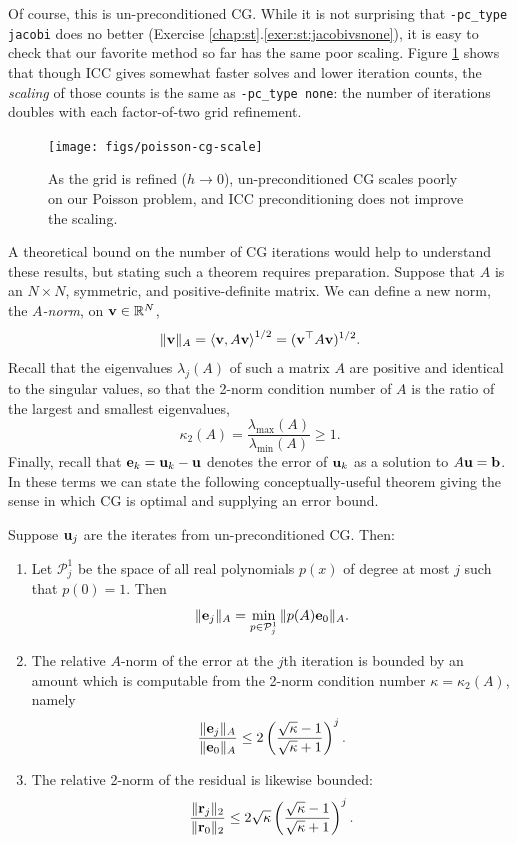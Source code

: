 Of course, this is un-preconditioned CG.  While it is not surprising that \texttt{-pc\_type jacobi} does no better (Exercise \ref{chap:st}.\ref{exer:st:jacobivsnone}), it is easy to check that our favorite method so far has the same poor scaling.  Figure \ref{fig:poisson-cg-scale} shows that though ICC gives somewhat faster solves and lower iteration counts, the \emph{scaling} of those counts is the same as \texttt{-pc\_type none}: the number of iterations doubles with each factor-of-two grid refinement.

\begin{figure}
\bigskip
\texttt{[image: figs/poisson-cg-scale]}
\caption{As the grid is refined ($h\to 0$), un-preconditioned CG scales poorly on our Poisson problem, and ICC preconditioning does not improve the scaling.}
\label{fig:poisson-cg-scale}
\end{figure}

A theoretical bound on the number of CG iterations would help to understand these results, but stating such a theorem requires preparation.  Suppose that $A$ is an $N\times N$, symmetric, and positive-definite matrix.  We can define a new norm, the \emph{$A$-norm}, on $\mathbf{v}\in\mathbb{R}^N$,
\begin{equation}
\|\mathbf{v}\|_A = \left<\mathbf{v},A\mathbf{v}\right>^{1/2} = (\mathbf{v}^\top A\mathbf{v})^{1/2}.  \label{normAdefn}
\end{equation}
Recall that the eigenvalues $\lambda_j(A)$ of such a matrix $A$ are positive and identical to the singular values, so that the 2-norm condition number of $A$ is the ratio of the largest and smallest eigenvalues,
	$$\kappa_2(A) = \frac{\lambda_{\max}(A)}{\lambda_{\min}(A)} \ge 1.$$
Finally, recall that $\mathbf{e}_k = \mathbf{u}_k - \mathbf{u}$ denotes the error of $\mathbf{u}_k$ as a solution to $A\mathbf{u}=\mathbf{b}$.  In these terms we can state the following conceptually-useful theorem giving the sense in which CG is optimal and supplying an error bound.

\renewcommand{\labelenumi}{(\roman{enumi})}
\begin{theorem}  \label{thm:cgiterations}
Suppose $\mathbf{u}_j$ are the iterates from un-preconditioned CG.  Then:\begin{enumerate}
\item Let $\mathcal{P}_j^1$ be the space of all real polynomials $p(x)$ of degree at most $j$ such that $p(0)=1$.  Then
    $$\|\mathbf{e}_j\|_A = \min_{p \in \mathcal{P}_j^1} \|p(A) \mathbf{e}_0\|_A.$$
\item The relative $A$-norm of the error at the $j$th iteration is bounded by an amount which is computable from the 2-norm condition number $\kappa=\kappa_2(A)$, namely
	$$\frac{\|\mathbf{e}_j\|_A}{\|\mathbf{e}_0\|_A} \le 2 \left(\frac{\sqrt{\kappa}-1}{\sqrt{\kappa}+1}\right)^j.$$
\item The relative 2-norm of the residual is likewise bounded:
	$$\frac{\|\mathbf{r}_j\|_2}{\|\mathbf{r}_0\|_2} \le 2 \sqrt{\kappa} \left(\frac{\sqrt{\kappa}-1}{\sqrt{\kappa}+1}\right)^j.$$
\end{enumerate}
\end{theorem}

